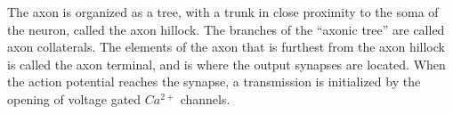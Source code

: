 The axon is organized as a tree, with a trunk in close proximity to the soma of the neuron, called the axon hillock.
The branches of the ``axonic tree'' are called axon collaterals. 
The elements of the axon that is furthest from the axon hillock is called the axon terminal, and is where the output synapses are located.
When the action potential reaches the synapse, a transmission is initialized by the opening of voltage gated $Ca^{2+}$ channels\cite{PrinciplesOfNeuralScience4edKAP10}.







